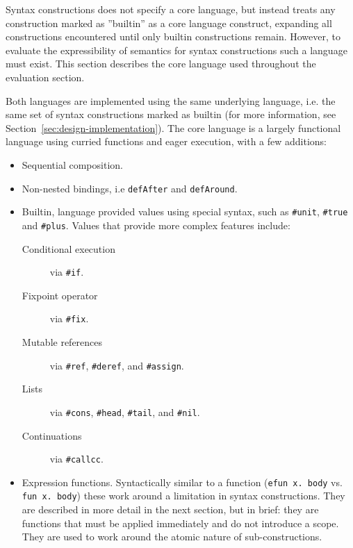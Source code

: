 \documentclass{kththesis}
\begin{document}
Syntax constructions does not specify a core language, but instead treats any construction marked as ''builtin'' as a core language construct, expanding all constructions encountered until only builtin constructions remain. However, to evaluate the expressibility of semantics for syntax constructions such a language must exist. This section describes the core language used throughout the evaluation section.

Both languages are implemented using the same underlying language, i.e. the same set of syntax constructions marked as builtin (for more information, see Section~\ref{sec:design-implementation}). The core language is a largely functional language using curried functions and eager execution, with a few additions:
\begin{itemize}
  \item Sequential composition.
  \item Non-nested bindings, i.e \texttt{defAfter} and \texttt{defAround}. %
  \item Builtin, language provided values using special syntax, such as \texttt{#unit}, \texttt{#true} and \texttt{#plus}. Values that provide more complex features include:
  \begin{description}
    \item[Conditional execution] via \texttt{#if}.
    \item[Fixpoint operator] via \texttt{#fix}.
    \item[Mutable references] via \texttt{#ref}, \texttt{#deref}, and \texttt{#assign}.
    \item[Lists] via \texttt{#cons}, \texttt{#head}, \texttt{#tail}, and \texttt{#nil}.
    \item[Continuations] via \texttt{#callcc}.
  \end{description}
  \item Expression functions. Syntactically similar to a function (\texttt{efun x. body} vs. \texttt{fun x. body}) these work around a limitation in syntax constructions. They are described in more detail in the next section, but in brief: they are functions that must be applied immediately and do not introduce a scope. They are used to work around the atomic nature of sub-constructions.
\end{itemize}
\end{document}
